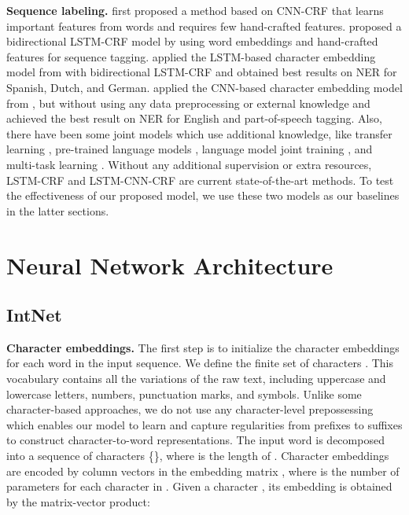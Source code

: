 \documentclass[11pt,a4paper]{article}
\begin{document}
\textbf{Sequence labeling.} \citet{collobert2011natural} first proposed a method based on CNN-CRF that learns important features from words and requires few hand-crafted features. \citet{huang2015bidirectional} proposed a bidirectional LSTM-CRF model by using word embeddings and hand-crafted features for sequence tagging. \citet{lample2016neural} applied the LSTM-based character embedding model from \citet{ling2015finding} with bidirectional LSTM-CRF and obtained best results on NER for Spanish, Dutch, and German. \citet{ma2016end} applied the CNN-based character embedding model from \citet{chiu2015named}, but without using any data preprocessing or external knowledge and achieved the best result on NER for English and part-of-speech tagging. Also, there have been some joint models which use additional knowledge, like transfer learning \cite{yang2017transfer}, pre-trained language models \cite{peters2017semisupervised}, language model joint training \cite{rei2017semisupervised}, and multi-task learning \cite{liu2017empower}. Without any additional supervision or extra resources, LSTM-CRF \cite{lample2016neural} and LSTM-CNN-CRF \cite{ma2016end} are current state-of-the-art methods. To test the effectiveness of our proposed model, we use these two models as our baselines in the latter sections.
 
\section{Neural Network Architecture}
\label{sec:architecture}

\subsection{IntNet}

\textbf{Character embeddings.} The first step is to initialize the character embeddings for each word  in the input sequence. We define the finite set of characters . This vocabulary contains all the variations of the raw text, including uppercase and lowercase letters, numbers, punctuation marks, and symbols. Unlike some character-based approaches, we do not use any character-level prepossessing which enables our model to learn and capture regularities from prefixes to suffixes to construct character-to-word representations. The input word  is decomposed into a sequence of characters \{\}, where  is the length of . Character embeddings are encoded by column vectors in the embedding matrix , where  is the number of parameters for each character in . Given a character , its embedding  is obtained by the matrix-vector product:
\end{document}
